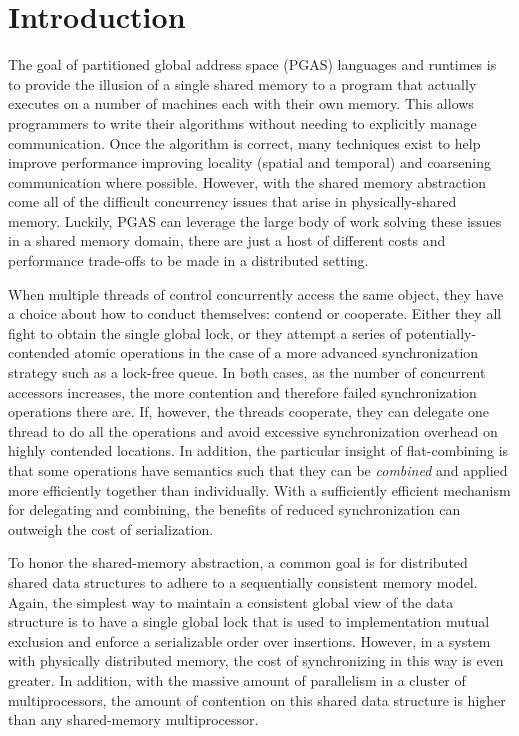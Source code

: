\section{Introduction}

The goal of partitioned global address space (PGAS) languages and runtimes is to provide the illusion of a single shared memory to a program that actually executes on a number of machines each with their own memory. This allows programmers to write their algorithms without needing to explicitly manage communication. Once the algorithm is correct, many techniques exist to help improve performance improving locality (spatial and temporal) and coarsening communication where possible. However, with the shared memory abstraction come all of the difficult concurrency issues that arise in physically-shared memory. Luckily, PGAS can leverage the large body of work solving these issues in a shared memory domain, there are just a host of different costs and performance trade-offs to be made in a distributed setting.

When multiple threads of control concurrently access the same object, they have a choice about how to conduct themselves: contend or cooperate. Either they all fight to obtain the single global lock, or they attempt a series of potentially-contended atomic operations in the case of a more advanced synchronization strategy such as a lock-free queue. In both cases, as the number of concurrent accessors increases, the more contention and therefore failed synchronization operations there are. If, however, the threads cooperate, they can delegate one thread to do all the operations and avoid excessive synchronization overhead on highly contended locations. In addition, the particular insight of flat-combining is that some operations have semantics such that they can be \emph{combined} and applied more efficiently together than individually. With a sufficiently efficient mechanism for delegating and combining, the benefits of reduced synchronization can outweigh the cost of serialization.

To honor the shared-memory abstraction, a common goal is for distributed shared data structures to adhere to a sequentially consistent memory model. Again, the simplest way to maintain a consistent global view of the data structure is to have a single global lock that is used to implementation mutual exclusion and enforce a serializable order over insertions. However, in a system with physically distributed memory, the cost of synchronizing in this way is even greater. In addition, with the massive amount of parallelism in a cluster of multiprocessors, the amount of contention on this shared data structure is higher than any shared-memory multiprocessor.

